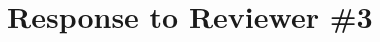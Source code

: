 \documentclass[default]{sn-jnl}%
\theoremstyle{thmstyleone}%
\theoremstyle{thmstyletwo}%
\theoremstyle{thmstylethree}%
\begin{document}

    







\section{Response to Reviewer \#3}
\label{sec:reviewer_3}
\end{document}
